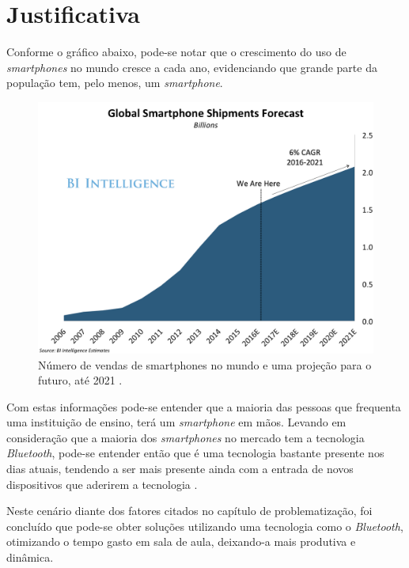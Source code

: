 \documentclass[
	12pt,
	oneside,
	a4paper,
	english,
	brazil,
]{abntex2}
\begin{document}

\chapter{Justificativa}

Conforme o gráfico abaixo, pode-se notar que o crescimento do uso de \emph{smartphones} no mundo cresce a cada ano, evidenciando que grande parte da população tem, pelo menos, um \emph{smartphone}.

\begin{figure}[h]
\centering
\includegraphics[width=1.0\textwidth]{smartphone_sales}
    \caption{
        Número de vendas de smartphones no mundo e uma projeção para o futuro, até 2021 \cite{smartphone-numbers-image}.
    }
\end{figure}

Com estas informações pode-se entender que a maioria das pessoas que frequenta uma instituição de ensino, terá um \emph{smartphone} em mãos. Levando em consideração que a maioria dos \emph{smartphones} no mercado tem a tecnologia \emph{Bluetooth}, pode-se entender então que é uma tecnologia bastante presente nos dias atuais, tendendo a ser mais presente ainda com a entrada de novos dispositivos que aderirem a tecnologia \cite{bluetooth-devices}.

Neste cenário diante dos fatores citados no capítulo de problematização, foi concluído que pode-se obter soluções utilizando uma tecnologia como o \emph{Bluetooth}, otimizando o tempo gasto em sala de aula, deixando-a mais produtiva e dinâmica.
\end{document}
